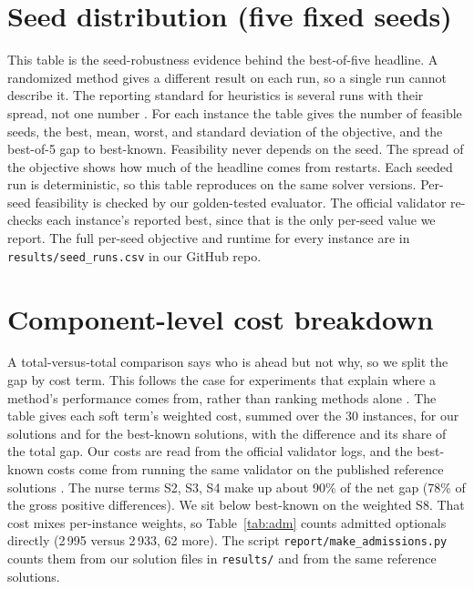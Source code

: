 \documentclass[11pt]{article}
\newcommand{\Sc}[1]{\textsf{S#1}}
\begin{document}
	\section{Seed distribution (five fixed seeds)}\label{app:dist}
	This table is the seed-robustness evidence behind the best-of-five headline. A randomized method gives a different result on each run, so a single run cannot describe it. The reporting standard for heuristics is several runs with their spread, not one number \citep{barr1995}. For each instance the table gives the number of feasible seeds, the best, mean, worst, and standard deviation of the objective, and the best-of-5 gap to best-known. Feasibility never depends on the seed. The spread of the objective shows how much of the headline comes from restarts. Each seeded run is deterministic, so this table
	reproduces on the same solver versions. Per-seed feasibility is checked by our golden-tested evaluator. The official validator re-checks each instance's reported best, since that is the only per-seed value we report. The full per-seed objective and runtime for every instance
	are in \texttt{results/seed\_runs.csv} in our GitHub repo.
	
	
	\section{Component-level cost breakdown}\label{app:comp}
	A total-versus-total comparison says who is ahead but not why, so we split the gap by cost term.
	This follows the case for experiments that explain where a method's performance comes from,
	rather than ranking methods alone \citep{hooker1995}.
	The table gives each soft term's weighted cost, summed over the 30 instances, for our solutions
	and for the best-known solutions, with the difference and its share of the total gap. Our costs are read from
	the official validator logs, and the best-known costs come from running the same validator on the
	published reference solutions \citep{ihtc2024site}. The nurse terms \Sc2, \Sc3, \Sc4 make up about 90\% of the net gap (78\% of the gross positive differences).
	We sit below best-known on the weighted \Sc8. That cost mixes per-instance weights, so Table~\ref{tab:adm} counts admitted optionals directly (2\,995 versus 2\,933, 62 more). The
	script \texttt{report/make\_admissions.py} counts them from our solution files in
	\texttt{results/} and from the same reference solutions.
	

	
\end{document}
